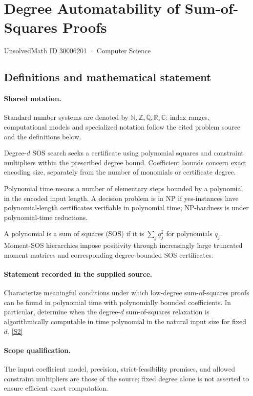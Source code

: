 \documentclass[11pt]{article}
\newcommand{\sref}[2]{\hyperlink{source:#1:#2}{[S#2]}}
\begin{document}
\setcounter{section}{30006200}
\section{Degree Automatability of Sum-of-Squares Proofs}\label{30006201}
{\small\sffamily UnsolvedMath ID 30006201 · Computer Science}
\subsection{Definitions and mathematical statement}

\paragraph{Shared notation.}Standard number systems are denoted by $\mathbb N,\mathbb Z,\mathbb Q,\mathbb R,\mathbb C$; index ranges, computational models and specialized notation follow the cited problem source and the definitions below.


Degree-$d$ SOS search seeks a certificate using polynomial squares and constraint multipliers within the prescribed degree bound. Coefficient bounds concern exact encoding size, separately from the number of monomials or certificate degree.

Polynomial time means a number of elementary steps bounded by a polynomial in the encoded input length. A decision problem is in $\mathrm{NP}$ if yes-instances have polynomial-length certificates verifiable in polynomial time; NP-hardness is under polynomial-time reductions.

A polynomial is a sum of squares (SOS) if it is $\sum_j q_j^2$ for polynomials $q_j$. Moment-SOS hierarchies impose positivity through increasingly large truncated moment matrices and corresponding degree-bounded SOS certificates.
\paragraph{Statement recorded in the supplied source.}
Characterize meaningful conditions under which low-degree sum-of-squares proofs can be found in polynomial time with polynomially bounded coefficients. In particular, determine when the degree-$d$ sum-of-squares relaxation is algorithmically computable in time polynomial in the natural input size for fixed $d$. \sref{30006201}{2}
\paragraph{Scope qualification.}
The input coefficient model, precision, strict-feasibility promises, and allowed constraint multipliers are those of the source; fixed degree alone is not asserted to ensure efficient exact computation.
\end{document}
